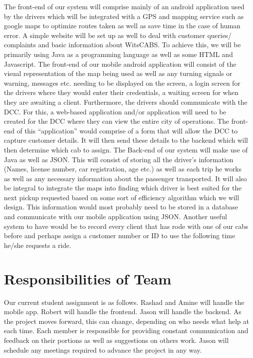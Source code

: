 \documentclass[a4paper,12pt]{article}
\begin{document}
The front-end of our system will comprise mainly of an android application used by the drivers which will be integrated with a GPS and mapping service such as google maps to optimize routes taken as well as save time in the case of human error. A simple website will be set up as well to deal with customer queries/ complaints and basic information about WitsCABS. To achieve this, we will be primarily using Java as a programming language as well as some HTML and Javascript. The front-end of our mobile android application will consist of the visual representation of the map being used as well as any turning signals or warning, messages etc. needing to be displayed on the screen, a login screen for the drivers where they would enter their credentials, a waiting screen for when they are awaiting a client. Furthermore, the drivers should communicate with the DCC. For this, a web-based application and/or application will need to be created for the DCC where they can view the entire city of operations. The front-end of this “application” would comprise of a form that will allow the DCC to capture customer details. It will then send these details to the backend which will then determine which cab to assign.
\vskip 0.07in
The Back-end of our system will make use of Java as well as JSON. This will consist of storing all the driver’s information (Names, license number, car registration, age etc.) as well as each trip he works as well as any necessary information about the passenger transported. It will also be integral to integrate the maps into finding which driver is best suited for the next pickup requested based on some sort of efficiency algorithm which we will design. This information would most probably need to be stored in a database and communicate with our mobile application using JSON. Another useful system to have would be to record every client that has rode with one of our cabs before and perhaps assign a customer number or ID to use the following time he/she requests a ride.

\section{Responsibilities of Team}
Our current student assignment is as follows. Rashad and Amine will handle the mobile app. Robert will handle the frontend. Jason will handle the backend. As the project moves forward, this can change, depending on who needs what help at each time. Each member is responsible for providing constant communication and feedback on their portions as well as suggestions on others work. Jason will schedule any meetings required to advance the project in any way.
\end{document}
